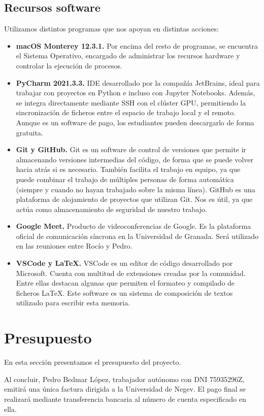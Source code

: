 \subsection*{Recursos software}
\noindent Utilizamos distintos programas que nos apoyan en distintas acciones:
\begin{itemize}
    \item \textbf{macOS Monterey 12.3.1.} Por encima del resto de programas, se encuentra el Sistema Operativo, encargado de administrar los recursos hardware y controlar la ejecución de procesos.
    \item \textbf{PyCharm 2021.3.3.} IDE desarrollado por la compañía JetBrains, ideal para trabajar con proyectos en Python e incluso con Jupyter Notebooks. Además, se integra directamente mediante SSH con el clúster GPU, permitiendo la sincronización de ficheros entre el espacio de trabajo local y el remoto. Aunque es un software de pago, los estudiantes pueden descargarlo de forma gratuita.
    \item \textbf{Git y GitHub.} Git es un software de control de versiones que permite ir almacenando versiones intermedias del código, de forma que se puede volver hacia atrás si es necesario. También facilita el trabajo en equipo, ya que puede combinar el trabajo de múltiples personas de forma automática (siempre y cuando no hayan trabajado sobre la misma línea). GitHub es una plataforma de alojamiento de proyectos que utilizan Git. Nos es útil, ya que actúa como almacenamiento de seguridad de nuestro trabajo.
    \item \textbf{Google Meet.} Producto de videoconferencias de Google. Es la plataforma oficial de comunicación síncrona en la Universidad de Granada. Será utilizado en las reuniones entre Rocío y Pedro.
    \item \textbf{VSCode y \LaTeX.} VSCode es un editor de código desarrollado por Microsoft. Cuenta con multitud de extensiones creadas por la comunidad. Entre ellas destacan algunas que permiten el formateo y compilado de ficheros \LaTeX. Este software es un sistema de composición de textos utilizado para escribir esta memoria.
\end{itemize}

\section*{Presupuesto}
En esta sección presentamos el presupuesto del proyecto.

Al concluir, Pedro Bedmar López, trabajador autónomo con DNI 75935296Z, emitirá una única factura dirigida a la Universidad de Negev. El pago final se realizará mediante transferencia bancaria al número de cuenta especificado en ella.

